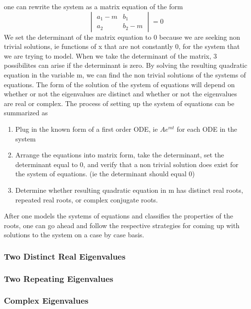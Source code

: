 \documentclass{article}
\begin{document}
one can rewrite the system as a matrix equation of the form
$$ \begin{vmatrix} 
a_1 - m & b_1\\
a_2 & b_2 - m 
\end{vmatrix} = 0 $$
We set the determinant of the matrix equation to 0 because we are seeking non trivial solutions, ie functions of x that are not constantly 0, for the system that we are trying to model. When we take the determinant of the matrix, 3 possibilites can arise if the determinant is zero. By solving the resulting quadratic equation in the variable m, we can find the non trivial solutions of the systems of equations. The form of the solution of the system of equations will depend on whether or not the eigenvalues are distinct and whether or not the eigenvalues are real or complex. The process of setting up the system of equations can be summarized as 

\begin{enumerate}
    \item Plug in the known form of a first order ODE, ie $Ae^{mt}$ for each ODE in the system
    \item Arrange the equations into matrix form, take the determinant, set the determinant equal to 0,  and verify that a non trivial solution does exist for the system of equations. (ie the determinant should equal 0)
    \item Determine whether resulting quadratic equation in m has distinct real roots, repeated real roots, or complex conjugate roots. 
\end{enumerate}

After one models the systems of equations and classifies the properties of the roots, one can go ahead and follow the respective strategies for coming up with solutions to the system on a case by case basis. 

\subsubsection{Two Distinct Real Eigenvalues}

\subsubsection{Two Repeating Eigenvalues}

\subsubsection{Complex Eigenvalues}
\end{document}

